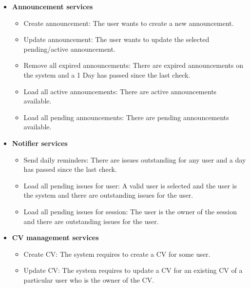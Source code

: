 \documentclass[12pt]{article}
\begin{document}
\begin{itemize}
	\item \textbf{Announcement services}
		\begin{itemize}
			\item Create announcement: The user wants to create a new announcement.
			\item Update announcement: The user wants to update the selected pending/active announcement.
			\item Remove all expired announcements: There are expired announcements on the system and a 1 Day has passed since the last check.
			\item Load all active announcements: There are active announcements available.
			\item Load all pending announcements: There are pending announcements available. 				
		\end{itemize}
		
	\item \textbf{Notifier services}
		\begin{itemize}
			\item Send daily reminders: There are issues outstanding for any user and a day has passed since the last check.
			\item Load all pending issues for user: A valid user is selected and the user is the system and there are outstanding issues for the user.	
			\item Load all pending issues for session: The user is the owner of the session and there are outstanding issues for the user.				
		\end{itemize}
		
	\item \textbf{CV management services}
		\begin{itemize}
			\item Create CV: The system requires to create a CV for some user.
			\item Update CV: The system requires to update a CV for an existing CV of a particular user who is the owner of the CV.					
		\end{itemize}	
\end{itemize}	
\end{document}
